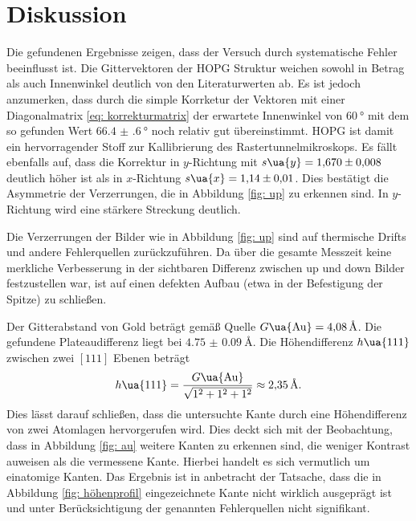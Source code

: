 \section{Diskussion}
Die gefundenen Ergebnisse zeigen, dass der Versuch durch systematische Fehler beeinflusst ist.
Die Gittervektoren der HOPG Struktur weichen sowohl in Betrag als auch Innenwinkel
deutlich von den Literaturwerten ab. Es ist jedoch anzumerken, dass durch die simple Korrketur der Vektoren
mit einer Diagonalmatrix \eqref{eq: korrekturmatrix} der erwartete Innenwinkel von $\SI{60}{\degree}$ mit dem so
gefunden Wert $\SI{66.4(6)}{\degree}$ noch relativ gut übereinstimmt. HOPG ist damit ein hervorragender Stoff
zur Kallibrierung des Rastertunnelmikroskops. Es fällt ebenfalls auf, dass die Korrektur in $y$-Richtung mit
$s\ua{y} = \num{1.670(8)}$ deutlich höher ist als in $x$-Richtung $s\ua{x} = \num{1.14(1)}$. Dies bestätigt
die Asymmetrie der Verzerrungen, die in Abbildung \ref{fig: up} zu erkennen sind. In $y$-Richtung
wird eine stärkere Streckung deutlich.

Die Verzerrungen der Bilder wie in Abbildung \ref{fig: up} sind auf thermische Drifts und andere Fehlerquellen
zurückzuführen. Da über die gesamte Messzeit keine merkliche Verbesserung in der sichtbaren Differenz zwischen
up und down Bilder festzustellen war, ist auf einen defekten Aufbau (etwa in der Befestigung der Spitze) zu schließen.

Der Gitterabstand von Gold beträgt gemäß Quelle \cite{gitterkonstanten} $G\ua{\ce{Au}} = \SI{4.08}{\angstrom}$. Die gefundene Plateaudifferenz
liegt bei $\SI{4.75(9)}{\angstrom}$. Die Höhendifferenz $h\ua{111}$ zwischen zwei $[111]$ Ebenen beträgt
\begin{equation}
  h\ua{111} = \frac{G\ua{\ce{Au}}}{\sqrt{1^2 + 1^2 + 1^2}} \approx \SI{2.35}{\angstrom}.
\end{equation}
Dies lässt darauf schließen, dass die untersuchte Kante durch eine Höhendifferenz von zwei Atomlagen
hervorgerufen wird. Dies deckt sich mit der Beobachtung, dass in Abbildung \ref{fig: au} weitere Kanten zu erkennen
sind, die weniger Kontrast auweisen als die vermessene Kante. Hierbei handelt es sich vermutlich um
einatomige Kanten.
Das Ergebnis ist in anbetracht der Tatsache,
dass die in Abbildung \ref{fig: höhenprofil} eingezeichnete Kante nicht wirklich ausgeprägt ist
und unter Berücksichtigung der genannten Fehlerquellen nicht signifikant.
